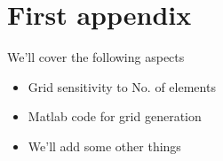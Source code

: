 \appendix
\chapter{First appendix}
We'll cover the following aspects
\begin{itemize}
  \item Grid sensitivity to No. of elements
  \item Matlab code for grid generation
  \item We'll add some other things
\end{itemize}